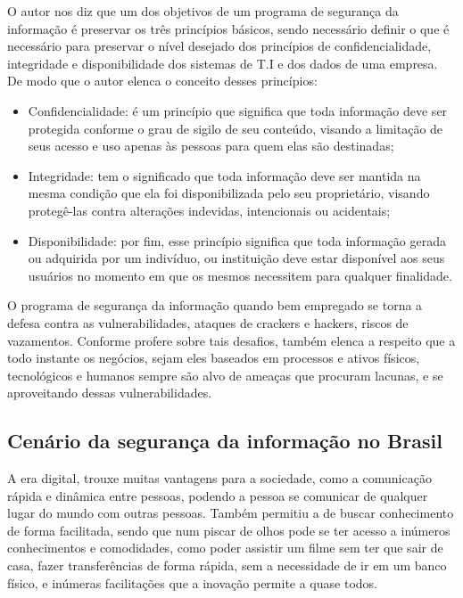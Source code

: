 \documentclass[
	12pt,				%
	openright,			%
	oneside,			%
	a4paper,			%
	english,			%
	french,				%
	spanish,			%
	brazil,				%
	]{abntex2}
\begin{document}
O autor  nos diz que um dos objetivos de um programa de segurança da informação é preservar os três princípios básicos, sendo necessário definir o que é necessário para preservar o nível desejado dos princípios de confidencialidade, integridade e disponibilidade dos sistemas de T.I e dos dados de uma empresa. De modo que o autor  elenca o conceito desses princípios:

\begin{itemize}
\item Confidencialidade: é um princípio que significa que toda informação deve ser protegida conforme o grau de sigilo de seu conteúdo, visando a limitação de seus acesso e uso apenas às pessoas para quem elas são destinadas;
\item Integridade: tem o significado que toda informação deve ser mantida na mesma condição que ela foi disponibilizada pelo seu proprietário, visando protegê-las contra alterações indevidas, intencionais ou acidentais;
\item Disponibilidade: por fim, esse princípio significa que toda informação gerada ou adquirida por um indivíduo, ou instituição deve estar disponível aos seus usuários no momento em que os mesmos necessitem para qualquer finalidade.
\end{itemize}

O programa de segurança da informação quando bem empregado se torna a defesa contra as vulnerabilidades, ataques de crackers e hackers, riscos de vazamentos. Conforme profere  sobre tais desafios, também elenca a respeito que a todo instante os negócios, sejam eles baseados em processos e ativos físicos, tecnológicos e humanos sempre são alvo de ameaças que procuram lacunas, e se aproveitando dessas vulnerabilidades.


\subsection{Cenário da segurança da informação no Brasil}

A era digital, trouxe muitas vantagens para a sociedade, como a comunicação rápida e dinâmica entre pessoas, podendo a pessoa se comunicar de qualquer lugar do mundo com outras pessoas. Também permitiu a de buscar conhecimento de forma facilitada, sendo que num piscar de olhos pode se ter acesso a inúmeros conhecimentos e comodidades, como poder assistir um filme sem ter que sair de casa, fazer transferências de forma rápida, sem a necessidade de ir em um banco físico, e inúmeras facilitações que a inovação permite a quase todos.
\end{document}
